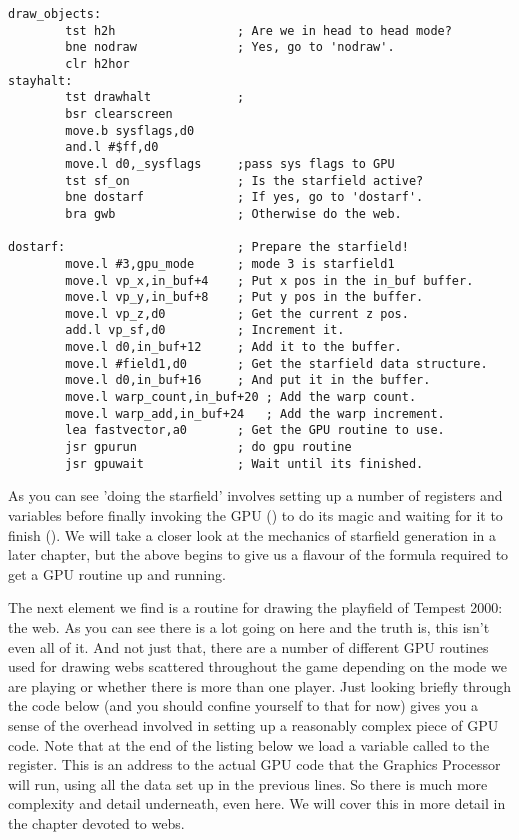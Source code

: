 \begin{lstlisting}[escapechar=\%]
draw_objects:
        tst h2h                 ; Are we in head to head mode?
        bne nodraw              ; Yes, go to 'nodraw'.
        clr h2hor
stayhalt:
        tst drawhalt            ; 
        bsr clearscreen
        move.b sysflags,d0
        and.l #$ff,d0
        move.l d0,_sysflags     ;pass sys flags to GPU
        tst sf_on               ; Is the starfield active?
        bne dostarf             ; If yes, go to 'dostarf'.
        bra gwb                 ; Otherwise do the web.

dostarf:                        ; Prepare the starfield!
        move.l #3,gpu_mode      ; mode 3 is starfield1
        move.l vp_x,in_buf+4    ; Put x pos in the in_buf buffer.
        move.l vp_y,in_buf+8    ; Put y pos in the buffer.
        move.l vp_z,d0          ; Get the current z pos.
        add.l vp_sf,d0          ; Increment it. 
        move.l d0,in_buf+12     ; Add it to the buffer.
        move.l #field1,d0       ; Get the starfield data structure.
        move.l d0,in_buf+16     ; And put it in the buffer.
        move.l warp_count,in_buf+20 ; Add the warp count.
        move.l warp_add,in_buf+24   ; Add the warp increment.
        lea fastvector,a0       ; Get the GPU routine to use.
        jsr gpurun              ; do gpu routine
        jsr gpuwait             ; Wait until its finished.

\end{lstlisting}

As you can see 'doing the starfield' involves setting up a number of registers and variables
before finally invoking the GPU () to do its magic and waiting for it to finish
(). We will take a closer look at the mechanics of starfield generation in a later
chapter, but the above begins to give us a flavour of the formula required to get a GPU routine up 
and running.

The next element we find is a routine for drawing the playfield of Tempest 2000: the web. As you can
see there is a lot going on here and the truth is, this isn't even all of it. And not just that,
there are a number of different GPU routines used for drawing webs scattered throughout the game depending
on the mode we are playing or whether there is more than one player. Just looking briefly through the code
below (and you should confine yourself to that for now) gives you a sense of the overhead involved in setting
up a reasonably complex piece of GPU code. Note that at the end of the listing below we load a variable called
 to the  register. This is an address to the actual GPU code that the Graphics Processor
will run, using all the data set up in the previous lines. So there is much more complexity and detail underneath,
even here. We will cover this in more detail in the chapter devoted to webs.

